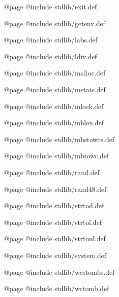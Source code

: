 @page
@include stdlib/exit.def

@page
@include stdlib/getenv.def

@page
@include stdlib/labs.def

@page
@include stdlib/ldiv.def

@page
@include stdlib/malloc.def

@page
@include stdlib/mstats.def

@page
@include stdlib/mlock.def

@page
@include stdlib/mblen.def

@page
@include stdlib/mbstowcs.def

@page
@include stdlib/mbtowc.def

@page
@include stdlib/rand.def

@page
@include stdlib/rand48.def

@page
@include stdlib/strtod.def

@page
@include stdlib/strtol.def

@page
@include stdlib/strtoul.def

@page
@include stdlib/system.def

@page
@include stdlib/wcstombs.def

@page
@include stdlib/wctomb.def

